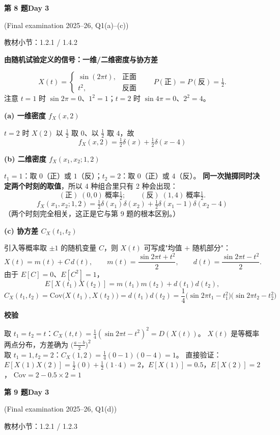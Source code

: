 \documentclass[10.5pt,fontset=fandol]{ctexart}
\newcommand{\key}[1]{\par\vspace{4pt}\noindent\textbf{\color{navy}#1}\par\vspace{2pt}}
\newcommand{\qtitle}[2]{\par\addvspace{1.2em}\Needspace{8\baselineskip}\begin{tcolorbox}[colback=navy,colframe=navy,arc=1.5pt,boxrule=0pt]\color{white}\large\bfseries #1\hfill\small #2\end{tcolorbox}}
\begin{document}
\qtitle{第 8 题}{Day 3}
{\small\color{accentred}(Final examination 2025--26, Q1(a)--(c))}\par\smallskip
{\small\color{muted}教材小节：1.2.1 / 1.4.2}\par\medskip
\noindent\textbf{由随机试验定义的信号：一维/二维密度与协方差}\par\smallskip\begin{tcolorbox}[breakable,colback=qbg,colframe=qbg,boxrule=0pt]\[
X(t)=\begin{cases}\sin(2\pi t), & \text{正面}\\[2pt] t^2, & \text{反面}\end{cases}
\qquad P(\text{正})=P(\text{反})=\tfrac12 .
\]
注意 $t=1$ 时 $\sin2\pi=0$、$1^2=1$；$t=2$ 时 $\sin4\pi=0$、$2^2=4$。

\key{(a) 一维密度 $f_X(x,2)$}
$t=2$ 时 $X(2)$ 以 $\tfrac12$ 取 $0$、以 $\tfrac12$ 取 $4$，故
\[
\boxed{f_X(x,2)=\tfrac12\delta(x)+\tfrac12\delta(x-4)}
\]

\key{(b) 二维密度 $f_X(x_1,x_2;1,2)$}
$t_1=1$：取 $0$（正）或 $1$（反）；$t_2=2$：取 $0$（正）或 $4$（反）。
\textbf{同一次抛掷同时决定两个时刻的取值}，所以 4 种组合里只有 2 种会出现：
\[
(\text{正})\;(0,0)\ \text{概率}\tfrac12;\qquad
(\text{反})\;(1,4)\ \text{概率}\tfrac12 .
\]
\[
\boxed{f_X(x_1,x_2;1,2)=\tfrac12\delta(x_1)\delta(x_2)+\tfrac12\delta(x_1-1)\delta(x_2-4)}
\]
（两个时刻完全相关，这正是它与第 9 题的根本区别。）

\key{(c) 协方差 $C_X(t_1,t_2)$}
引入等概率取 $\pm1$ 的随机变量 $C$，则 $X(t)$ 可写成"均值 $+$ 随机部分"：
\[
X(t)=m(t)+C\,d(t),\qquad
m(t)=\frac{\sin2\pi t+t^2}{2},\qquad
d(t)=\frac{\sin2\pi t-t^2}{2}.
\]
由于 $E[C]=0$、$E[C^2]=1$，
\[
E[X(t_1)X(t_2)]=m(t_1)m(t_2)+d(t_1)d(t_2),
\]
\[
\boxed{C_X(t_1,t_2)=\mathrm{Cov}\big(X(t_1),X(t_2)\big)=d(t_1)d(t_2)
=\frac14\big(\sin2\pi t_1-t_1^2\big)\big(\sin2\pi t_2-t_2^2\big)}
\]

\key{校验}
取 $t_1=t_2=t$：$C_X(t,t)=\tfrac14(\sin2\pi t-t^2)^2=D(X(t))$。
$X(t)$ 是等概率两点分布，方差确为 $\big(\tfrac{a-b}{2}\big)^2$ \checkmark\\[2pt]
取 $t_1=1,t_2=2$：$C_X(1,2)=\tfrac14(0-1)(0-4)=1$。
直接验证：$E[X(1)X(2)]=\tfrac12(0)+\tfrac12(1\cdot4)=2$，$E[X(1)]=0.5$，$E[X(2)]=2$，
$\mathrm{Cov}=2-0.5\times2=1$ \checkmark
\end{tcolorbox}
\qtitle{第 9 题}{Day 3}
{\small\color{accentred}(Final examination 2025--26, Q1(d))}\par\smallskip
{\small\color{muted}教材小节：1.2.1 / 1.2.3}\par\medskip
\end{document}
